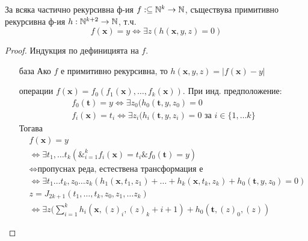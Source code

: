 \begin{theorem}
    За всяка частично рекурсивна ф-ия $f: \subseteq {\mathbb{N}}^k \to {\mathbb{N}}$, съществува примитивно рекурсивна ф-ия $h: {\mathbb{N}}^{k+2} \to {\mathbb{N}}$, т.ч. 
    \begin{equation}
        f(\textbf{x}) = y \iff \exists z (h(\textbf{x}, y, z) = 0)
    \end{equation}
\end{theorem}
\begin{proof}
    Индукция по дефиницията на $f$.
    \begin{itemize}
        \item[база] Ако $f$ е примитивно рекурсивна, то $h(\textbf{x}, y, z) = |f(\textbf{x}) - y|$
        \item[операции]
            \subitem[суперпозиция] $f(\textbf{x}) = f_0(f_1(\textbf{x}), \dots, f_k(\textbf{x}))$. При инд. предположение:
            \begin{equation*}
                \begin{split}
                    f_0(\textbf{t}) = y \iff \exists z_0 (h_0(\textbf{t}, y, z_0) = 0\\
                    f_i(\textbf{x}) = t_i \iff \exists z_i (h_i(\textbf{t}, y, z_i) = 0 \text{ за } i \in \{1, \dots k\}
                \end{split}
            \end{equation*}
            Тогава
            \begin{equation*}
            \begin{split}
                & f(\textbf{x}) = y \\
                & \iff \exists t_1, \dots t_k (\&_{i=1}^{k} f_i(\textbf{x}) = t_i \& f_0(\textbf{t}) = y) \\
                & \iff \text{пропуснах реда, естествена трансформация е}\\
                & \iff \exists t_1 \dots t_k, z_0 \dots z_k (h_1(\textbf{x}, t_1, z_1) + \dots + h_k(\textbf{x}, t_k, z_k) + h_0(\textbf{t}, y, z_0) = 0)\\
                & z = J_{2k+1}(t_1, \dots, t_k, z_0, z_1, \dots z_k) \\
                & \iff \exists z (\sum\limits_{i=1}^{k} h_i(\textbf{x}, (z)_i, (z)_k+i+1) + h_0(\textbf{t}, (z)_0, (z)) 
            \end{split}
            \end{equation*}
            \begin{equation*}

\end{equation*}
\end{itemize}
\end{proof}
